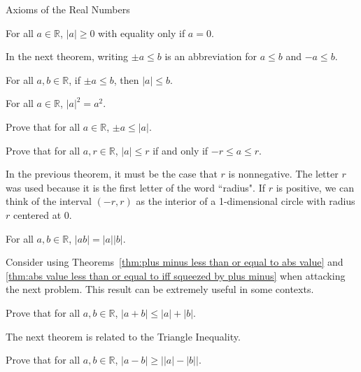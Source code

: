 \begin{section}{Axioms of the Real Numbers}
\begin{theorem}
For all $a\in\mathbb{R}$, $|a|\geq 0$ with equality only if $a=0$.
\end{theorem}

In the next theorem, writing $\pm a\leq b$ is an abbreviation for $a\leq b$ and $-a\leq b$.

\begin{theorem}
For all $a,b\in\mathbb{R}$, if $\pm a\leq b$, then $|a|\leq b$. 
\end{theorem}

\begin{theorem}
For all $a\in\mathbb{R}$, $|a|^2=a^2$.
\end{theorem}

\begin{theorem}\label{thm:plus minus less than or equal to abs value}
Prove that for all $a\in\mathbb{R}$, $\pm a\leq |a|$.
\end{theorem}

\begin{theorem}\label{thm:abs value less than or equal to iff squeezed by plus minus}
Prove that for all $a,r\in\mathbb{R}$, $|a|\leq r$ if and only if $-r\leq a\leq r$.
\end{theorem}

In the previous theorem, it must be the case that $r$ is nonnegative.  The letter $r$ was used because it is the first letter of the word ``radius". If $r$ is positive, we can think of the interval $(-r,r)$ as the interior of a 1-dimensional circle with radius $r$ centered at 0.

\begin{theorem}
For all $a,b\in\mathbb{R}$, $|ab|=|a||b|$.
\end{theorem}

Consider using Theorems~\ref{thm:plus minus less than or equal to abs value} and \ref{thm:abs value less than or equal to iff squeezed by plus minus} when attacking the next problem.  This result can be extremely useful in some contexts. 

\begin{theorem}
Prove that for all $a,b\in\mathbb{R}$, $|a+b|\leq |a|+|b|$.
\end{theorem}

The next theorem is related to the Triangle Inequality.

\begin{theorem}
Prove that for all $a,b\in\mathbb{R}$, $|a-b|\geq \left||a|-|b| \right|$.
\end{theorem}

\end{section}